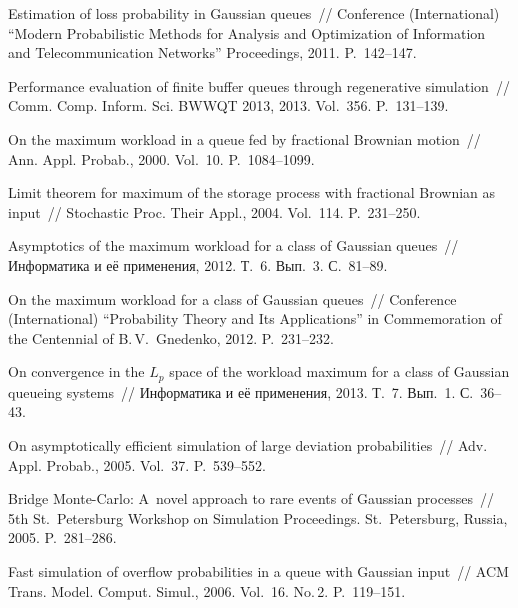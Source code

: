 \begin{multicols}{2}
{{\begin{thebibliography}{99}
Estimation of loss probability
in Gaussian queues~// {Conference (International) ``Modern
Probabilistic Methods for Analysis and Optimization of Information and
Telecommunication Networks'' Proceedings}, 2011. P.~142--147.

Performance evaluation of finite buffer queues through regenerative simulation~//
Comm. Comp. Inform. Sci. BWWQT 2013, 2013.
Vol.~356. P.~131--139.


 On the maximum workload in a queue fed
by fractional Brownian motion~// {Ann. Appl. Probab}., 2000. Vol.~10. P.~1084--1099.

 Limit theorem for maximum
of the storage process with fractional Brownian as input~//
{Stochastic Proc. Their Appl.}, 2004. Vol.~114. P.~231--250.


  Asymptotics of the maximum
workload for a class of Gaussian queues~// Информатика и её применения, 2012.
Т.~6. Вып.~3. С.~81--89.

 On the maximum workload for
a class of Gaussian queues~// {Conference (International) ``Probability
Theory and Its Applications'' in Commemoration of the Centennial of
B.\,V.~Gnedenko}, 2012. P.~231--232.

On convergence in the $L_p$
space of the workload maximum for a class of Gaussian queueing
systems~// Информатика и её применения, 2013.
Т.~7. Вып.~1. С.~36--43.

On asymptotically efficient simulation of large deviation probabilities~//
{Adv. Appl. Probab.}, 2005. Vol.~37. P.~539--552.





Bridge Monte-Carlo: A~novel approach to rare events of Gaussian processes~//
{5th St.\ Petersburg Workshop on Simulation Proceedings}.
St.\ Petersburg, Russia, 2005. P.~281--286.

  Fast simulation of overflow
probabilities in a queue with Gaussian input~// {ACM Trans. Model.
Comput. Simul.}, 2006. Vol.~16. No.\,2. P.~119--151.


\end{thebibliography}}}
\end{multicols}
